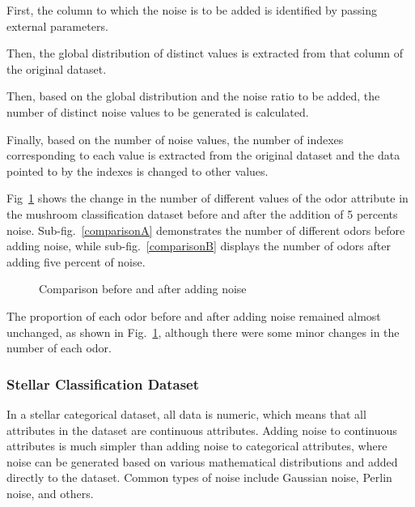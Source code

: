 \documentclass[runningheads,a4paper]{llncs}
\begin{document}
First, the column to which the noise is to be added is identified by passing external parameters.

Then, the global distribution of distinct values is extracted from that column of the original dataset.

Then, based on the global distribution and the noise ratio to be added, the number of distinct noise values to be generated is calculated.

Finally, based on the number of noise values, the number of indexes corresponding to each value is extracted from the original dataset and the data pointed to by the indexes is changed to other values.

Fig~\ref{Comparison before and after adding noise} shows the change in the number of different values of the odor attribute in the mushroom classification dataset before and after the addition of 5 percents noise.
Sub-fig.~\ref{comparisonA} demonstrates the number of different odors before adding noise, while sub-fig.~\ref{comparisonB} displays the number of odors after adding five percent of noise.
\begin{figure}[H]
    \centering

    \hfill


    \caption{Comparison before and after adding noise}
    \label{Comparison before and after adding noise}
\end{figure}

The proportion of each odor before and after adding noise remained almost unchanged, as shown in Fig.~\ref{Comparison before and after adding noise}, although there were some minor changes in the number of each odor.

\subsubsection{Stellar Classification Dataset}
In a stellar categorical dataset, all data is numeric, which means that all attributes in the dataset are continuous attributes. Adding noise to continuous attributes is much simpler than adding noise to categorical attributes, where noise can be generated based on various mathematical distributions and added directly to the dataset.
Common types of noise include Gaussian noise, Perlin noise, and others.
\end{document}
